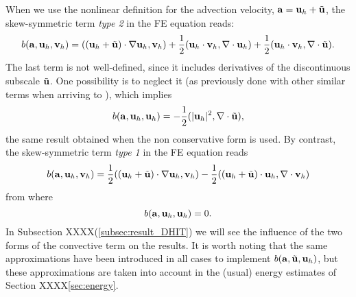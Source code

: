 \begin{remark}
\label{rem-skewsym}
When we use the nonlinear definition for the advection velocity, ${\bf a}={\bf u}_h+\tilde{{\bf u}}$, the skew-symmetric term \textit{type 2}  in the FE equation  reads: 
\begin{equation}
\label{eq-C2_b_skew2_aux1}
b({\bf a},{\bf u}_h,{\bf v}_h)=(({\bf u}_h+\tilde{{\bf u}})\cdot\nabla{\bf u}_h,{\bf v}_h)+\frac{1}{2}({\bf u}_h\cdot{\bf v}_h,\nabla\cdot{\bf u}_h)+\frac{1}{2}({\bf u}_h\cdot{\bf v}_h,\nabla\cdot\tilde{{\bf u}}).
\end{equation}
The last term is not well-defined, since it includes derivatives of the discontinuous subscale $\tilde{{\bf u}}$. One possibility is to neglect it (as previously done with other similar terms when arriving to ), which implies
\begin{equation}
b({\bf a},{\bf u}_h,{\bf u}_h)=-\frac{1}{2}(|{\bf u}_h|^2,\nabla\cdot\tilde{{\bf u}}),
\end{equation}
the same result obtained when the non conservative form is used.
By contrast, the skew-symmetric term \textit{type 1} in the FE equation  reads
\begin{equation}
\label{eq-C2_b_skew1_aux1}
b({\bf a},{\bf u}_h,{\bf v}_h)=\frac{1}{2}(({\bf u}_h+\tilde{{\bf u}})\cdot\nabla{\bf u}_h,{\bf v}_h)-\frac{1}{2}(({\bf u}_h+\tilde{{\bf u}})\cdot{\bf u}_h,\nabla\cdot{\bf v}_h)
\end{equation}
from where
\begin{equation}
b({\bf a},{\bf u}_h,{\bf u}_h)=0.
\end{equation}
In Subsection XXXX(\ref{subsec:result_DHIT}) we will see the influence of the two forms of the convective term on the results.
It is worth noting that the same approximations have been introduced in all cases to implement $b({\bf a},\tilde{{\bf u}},{\bf u}_h)$, but these approximations are taken into account in the (usual) energy estimates of Section XXXX\ref{sec:energy}.
\end{remark}

